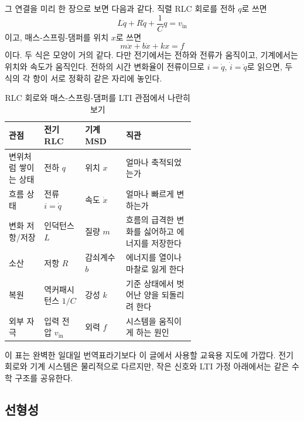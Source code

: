 그 연결을 미리 한 장으로 보면 다음과 같다.
직렬 RLC 회로를 전하 $q$로 쓰면
\begin{equation}
  L\ddot{q}+R\dot{q}+\frac{1}{C}q=v_{\mathrm{in}}
\end{equation}
이고, 매스-스프링-댐퍼를 위치 $x$로 쓰면
\begin{equation}
  m\ddot{x}+b\dot{x}+kx=f
\end{equation}
이다.
두 식은 모양이 거의 같다.
다만 전기에서는 전하와 전류가 움직이고, 기계에서는 위치와 속도가 움직인다.
전하의 시간 변화율이 전류이므로 $i=\dot{q}$, $\dot{i}=\ddot{q}$로 읽으면, 두 식의 각 항이 서로 정확히 같은 자리에 놓인다.
%

\begin{table}[!htbp]
  \centering
  \caption{RLC 회로와 매스-스프링-댐퍼를 LTI 관점에서 나란히 보기}
  \small
  \setlength{\tabcolsep}{4pt}
  \begin{tabularx}{\linewidth}{@{}>{\raggedright\arraybackslash}p{0.19\linewidth}>{\raggedright\arraybackslash}p{0.22\linewidth}>{\raggedright\arraybackslash}p{0.22\linewidth}>{\raggedright\arraybackslash}X@{}}
    \toprule
    관점 & 전기 RLC & 기계 MSD & 직관 \\
    \midrule
    변위처럼 쌓이는 상태 & 전하 $q$ & 위치 $x$ & 얼마나 축적되었는가 \\
    흐름 상태 & 전류 $i=\dot{q}$ & 속도 $\dot{x}$ & 얼마나 빠르게 변하는가 \\
    변화 저항/저장 & 인덕턴스 $L$ & 질량 $m$ & 흐름의 급격한 변화를 싫어하고 에너지를 저장한다 \\
    소산 & 저항 $R$ & 감쇠계수 $b$ & 에너지를 열이나 마찰로 잃게 한다 \\
    복원 & 역커패시턴스 $1/C$ & 강성 $k$ & 기준 상태에서 벗어난 양을 되돌리려 한다 \\
    외부 자극 & 입력 전압 $v_{\mathrm{in}}$ & 외력 $f$ & 시스템을 움직이게 하는 원인 \\
    \bottomrule
  \end{tabularx}
\end{table}

이 표는 완벽한 일대일 번역표라기보다 이 글에서 사용할 교육용 지도에 가깝다.
전기 회로와 기계 시스템은 물리적으로 다르지만, 작은 신호와 LTI 가정 아래에서는 같은 수학 구조를 공유한다.

\subsection{선형성}

